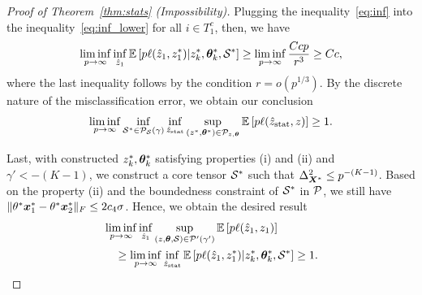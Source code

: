 \documentclass[journal]{IEEEtran}
\theoremstyle{definition}
\theoremstyle{definition}
\begin{document}
\begin{proof}[Proof of Theorem~\ref{thm:stats} (Impossibility)]
   Plugging the inequality~\eqref{eq:inf} into the inequality~\eqref{eq:inf_lower} for all $i \in T_1^c$, then, we have 
   \begin{equation}
       \liminf_{p \rightarrow \infty}  \inf_{\hat z_1 } \mathbb{E} \left[ p \ell(\hat z_1, z_1^*) | z^*_k, \boldsymbol{\theta}^*_k, \mathcal{S}^*  \right]  \geq \liminf_{p \rightarrow \infty} \frac{ C cp }{r^3} \geq C c,
   \end{equation}
   where the last inequality follows by the condition $r = o(p^{1/3})$. By the discrete nature of the misclassification error, we obtain our conclusion
   \begin{equation}
       \liminf_{p \rightarrow \infty} \inf_{\mathcal{S}^* \in  \mathcal{P}_{\mathcal{S}}(\gamma)}  \inf_{\hat z_{\text{stat}} }\sup_{ (z^*, \boldsymbol{\theta}^*) \in \mathcal{P}_{z, \boldsymbol{\theta}}} \mathbb{E} \left[ p\ell(\hat z_{\text{stat}}, z) \right]  \geq 1. 
   \end{equation}

{


Last, with constructed $z^*_k, \boldsymbol{\theta}^*_k$ satisfying properties (i) and (ii) and $\gamma' < -(K-1)$, we construct a core tensor $\mathcal{S}^*$ such that $\Delta_{\bm X^*}^2 \leq p^{-(K-1)}$. Based on the property (ii) and the boundedness constraint of $\mathcal{S}^*$ in $\mathcal{P}$, we still have $\lVert \theta^* \bm x_1^*  - \theta^* \bm x_2^*\rVert_F \leq 2c_4 \sigma$. Hence, we obtain the desired result 
\begin{align}
    &\liminf_{p \rightarrow \infty} \inf_{\hat z_1} \sup_{(z, \boldsymbol{\theta}, \mathcal{S}) \in \mathcal{P}'(\gamma')} \mathbb{E} \left[ p\ell(\hat z_1, z_1) \right]  \\
    &\quad \geq   \liminf_{p \rightarrow \infty} \inf_{\hat z_{\rm stat}}  \mathbb{E} \left[ p\ell(\hat z_1, z^*_1) |  z^*_k, \boldsymbol{\theta}^*_k, \mathcal{S}^*  \right]  \geq 1.
\end{align}



}

   \end{proof}
\end{document}

